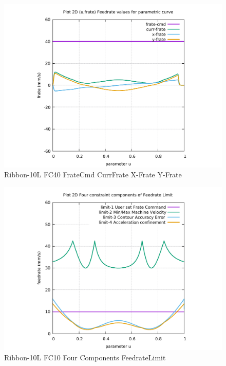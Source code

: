 \begin{figure}
	\caption     {Ribbon-10L FC40 FrateCmd CurrFrate X-Frate Y-Frate}
	\label{30-img-Ribbon-10L-FC40-FrateCmd-CurrFrate-X-Frate-Y-Frate.pdf}
\includegraphics[width=1.00\textwidth]{Chap4/appendix/app-Ribbon-10L/plots/30-img-Ribbon-10L-FC40-FrateCmd-CurrFrate-X-Frate-Y-Frate.pdf}
\end{figure}


\clearpage
\pagebreak

\begin{figure}
	\caption     {Ribbon-10L FC10 Four Components FeedrateLimit}
	\label{31-img-Ribbon-10L-FC10-Four-Components-FeedrateLimit.pdf}
\includegraphics[width=1.00\textwidth]{Chap4/appendix/app-Ribbon-10L/plots/31-img-Ribbon-10L-FC10-Four-Components-FeedrateLimit.pdf}
\end{figure}



